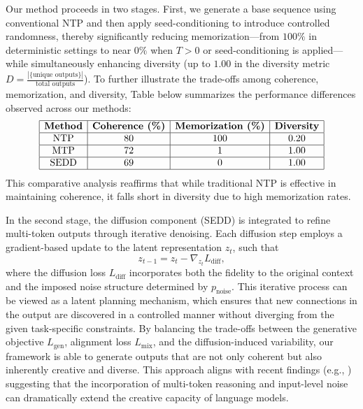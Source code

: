 \documentclass{article} %
\begin{document}
Our method proceeds in two stages. First, we generate a base sequence using conventional NTP and then apply seed-conditioning to introduce controlled randomness, thereby significantly reducing memorization—from \(100\%\) in deterministic settings to near \(0\%\) when \(T>0\) or seed-conditioning is applied—while simultaneously enhancing diversity (up to \(1.00\) in the diversity metric \( D = \frac{|\{ \text{unique outputs} \}|}{\text{total outputs}} \)). To further illustrate the trade-offs among coherence, memorization, and diversity, Table below summarizes the performance differences observed across our methods:
\[
\begin{array}{|c|c|c|c|}
\hline
\textbf{Method} & \textbf{Coherence (\%)} & \textbf{Memorization (\%)} & \textbf{Diversity} \\
\hline
\text{NTP}  & 80  & 100 & 0.20 \\
\hline
\text{MTP}  & 72  & 1   & 1.00 \\
\hline
\text{SEDD} & 69  & 0   & 1.00 \\
\hline
\end{array}
\]
This comparative analysis reaffirms that while traditional NTP is effective in maintaining coherence, it falls short in diversity due to high memorization rates.

In the second stage, the diffusion component (SEDD) is integrated to refine multi-token outputs through iterative denoising. Each diffusion step employs a gradient-based update to the latent representation \( z_t \), such that
\[
z_{t-1} = z_t - \nabla_{z_t} L_{\text{diff}},
\]
where the diffusion loss \( L_{\text{diff}} \) incorporates both the fidelity to the original context and the imposed noise structure determined by \( p_{\text{noise}} \). This iterative process can be viewed as a latent planning mechanism, which ensures that new connections in the output are discovered in a controlled manner without diverging from the given task-specific constraints. By balancing the trade-offs between the generative objective \( L_{\text{gen}} \), alignment loss \( L_{\text{mix}} \), and the diffusion-induced variability, our framework is able to generate outputs that are not only coherent but also inherently creative and diverse. This approach aligns with recent findings (e.g., \cite{nagarajan2025roll}) suggesting that the incorporation of multi-token reasoning and input-level noise can dramatically extend the creative capacity of language models.
\end{document}
